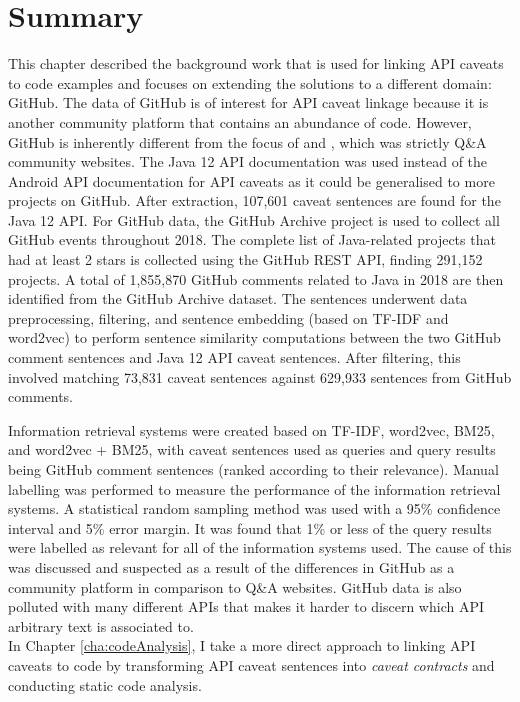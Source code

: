 \section{Summary}
\label{sec:info-summary}
This chapter described the background work that is used for linking API caveats to code examples and focuses on extending the solutions to a different domain: GitHub. The data of GitHub is of interest for API caveat linkage because it is another community platform that contains an abundance of code. However, GitHub is inherently different from the focus of \cite{jiamou} and \cite{xiaoxue}, which was strictly Q\&A community websites. The Java 12 API documentation was used instead of the Android API documentation for API caveats as it could be generalised to more projects on GitHub. After extraction, 107,601
caveat sentences are found for the Java 12 API. For GitHub data, the GitHub Archive project is used to collect all GitHub events throughout 2018. The complete list of Java-related projects that had at least 2 stars is collected using the GitHub REST API, finding 291,152 projects. A total of 1,855,870 GitHub comments related to Java in 2018 are then identified from the GitHub Archive dataset. The sentences underwent data preprocessing, filtering, and sentence embedding (based on TF-IDF and word2vec) to perform sentence similarity computations between the two GitHub comment sentences and Java 12 API caveat sentences. After filtering, this involved matching 73,831 caveat sentences against 629,933 sentences from GitHub comments. \bigbreak

Information retrieval systems were created based on TF-IDF, word2vec, BM25, and word2vec + BM25, with caveat sentences used as queries and query results being GitHub comment sentences (ranked according to their relevance). Manual labelling was performed to measure the performance of the information retrieval systems. A statistical random sampling method was used with a 95\% confidence interval and 5\% error margin. It was found that 1\% or less of the query results were labelled as relevant for all of the information systems used. The cause of this was discussed and suspected as a result of the differences in GitHub as a community platform in comparison to Q\&A websites. GitHub data is also polluted with many different APIs that makes it harder to discern which API arbitrary text is associated to.\\
In Chapter \ref{cha:codeAnalysis}, I take a more direct approach to linking API caveats to code by transforming API caveat sentences into \textit{caveat contracts} and conducting static code analysis.

